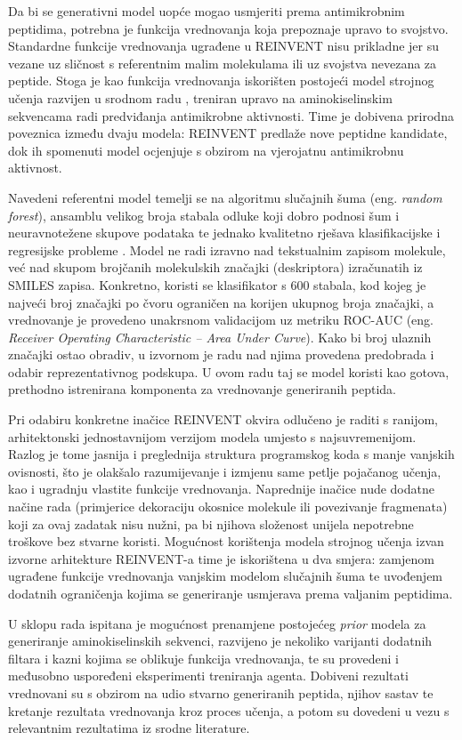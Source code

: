 Da bi se generativni model uopće mogao usmjeriti prema antimikrobnim
peptidima, potrebna je funkcija vrednovanja koja prepoznaje upravo to
svojstvo. Standardne funkcije vrednovanja ugrađene u REINVENT nisu
prikladne jer su vezane uz sličnost s referentnim malim molekulama ili uz
svojstva nevezana za peptide. Stoga je kao funkcija vrednovanja iskorišten
postojeći model strojnog učenja razvijen u srodnom radu \cite{negovetic2022},
treniran upravo na aminokiselinskim sekvencama radi predviđanja
antimikrobne aktivnosti. Time je dobivena prirodna poveznica između dvaju
modela: REINVENT predlaže nove peptidne kandidate, dok ih spomenuti model
ocjenjuje s obzirom na vjerojatnu antimikrobnu aktivnost.

Navedeni referentni model temelji se na algoritmu slučajnih šuma
(eng. \emph{random forest}), ansamblu velikog broja stabala odluke koji
dobro podnosi šum i neuravnotežene skupove podataka te jednako kvalitetno
rješava klasifikacijske i regresijske probleme \cite{negovetic2022}. Model
ne radi izravno nad tekstualnim zapisom molekule, već nad skupom
brojčanih molekulskih značajki (deskriptora) izračunatih iz SMILES zapisa.
Konkretno, koristi se klasifikator s 600 stabala, kod kojeg je najveći broj
značajki po čvoru ograničen na korijen ukupnog broja značajki, a vrednovanje
je provedeno unakrsnom validacijom uz metriku ROC-AUC (eng. \emph{Receiver
Operating Characteristic -- Area Under Curve}). Kako bi broj ulaznih
značajki ostao obradiv, u izvornom je radu nad njima provedena predobrada i
odabir reprezentativnog podskupa. U ovom radu taj se model koristi kao
gotova, prethodno istrenirana komponenta za vrednovanje generiranih peptida.

Pri odabiru konkretne inačice REINVENT okvira odlučeno je raditi s
ranijom, arhitektonski jednostavnijom verzijom modela umjesto s
najsuvremenijom. Razlog je tome jasnija i preglednija struktura programskog
koda s manje vanjskih ovisnosti, što je olakšalo razumijevanje i izmjenu
same petlje pojačanog učenja, kao i ugradnju vlastite funkcije vrednovanja.
Naprednije inačice nude dodatne načine rada (primjerice dekoraciju okosnice
molekule ili povezivanje fragmenata) koji za ovaj zadatak nisu nužni, pa bi
njihova složenost unijela nepotrebne troškove bez stvarne koristi.
Mogućnost korištenja modela strojnog učenja izvan izvorne arhitekture
REINVENT-a time je iskorištena u dva smjera: zamjenom ugrađene funkcije
vrednovanja vanjskim modelom slučajnih šuma te uvođenjem dodatnih
ograničenja kojima se generiranje usmjerava prema valjanim peptidima.

U sklopu rada ispitana je mogućnost prenamjene postojećeg \emph{prior}
modela za generiranje aminokiselinskih sekvenci, razvijeno je nekoliko
varijanti dodatnih filtara i kazni kojima se oblikuje funkcija vrednovanja,
te su provedeni i međusobno uspoređeni eksperimenti treniranja agenta.
Dobiveni rezultati vrednovani su s obzirom na udio stvarno generiranih
peptida, njihov sastav te kretanje rezultata vrednovanja kroz proces učenja,
a potom su dovedeni u vezu s relevantnim rezultatima iz srodne literature.
